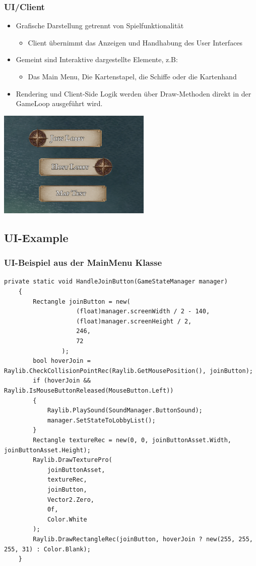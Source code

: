 \documentclass{beamer}
\begin{document}
\begin{frame}
  \frametitle{UI/Client}
  \begin{itemize}
    \item Grafische Darstellung getrennt von Spielfunktionalität
      \begin{itemize}
        \item Client übernimmt das Anzeigen und Handhabung des User Interfaces 
      \end{itemize}
    \item Gemeint sind Interaktive dargestellte Elemente, z.B:
    \begin{itemize} 
      \item Das Main Menu, Die Kartenstapel, die Schiffe oder die Kartenhand
    \end{itemize}
    \item Rendering und Client-Side Logik werden über Draw-Methoden direkt in der GameLoop ausgeführt wird.
  \end{itemize} 
  \centering
  \includegraphics[width=0.55\textwidth]{MainMenu.png}
\end{frame}

\subsection{UI-Example}
\begin{frame}[fragile]
  \frametitle{UI-Beispiel aus der MainMenu Klasse}
  \begin{lstlisting}[language=CSharp, basicstyle=\ttfamily\tiny, breaklines=true]
    private static void HandleJoinButton(GameStateManager manager)
    {
        Rectangle joinButton = new(
                    (float)manager.screenWidth / 2 - 140,
                    (float)manager.screenHeight / 2,
                    246,
                    72
                );
        bool hoverJoin = Raylib.CheckCollisionPointRec(Raylib.GetMousePosition(), joinButton);
        if (hoverJoin && Raylib.IsMouseButtonReleased(MouseButton.Left))
        {
            Raylib.PlaySound(SoundManager.ButtonSound);
            manager.SetStateToLobbyList();
        }
        Rectangle textureRec = new(0, 0, joinButtonAsset.Width, joinButtonAsset.Height);
        Raylib.DrawTexturePro(
            joinButtonAsset,
            textureRec,
            joinButton,
            Vector2.Zero,
            0f,
            Color.White
        );
        Raylib.DrawRectangleRec(joinButton, hoverJoin ? new(255, 255, 255, 31) : Color.Blank);
    }
  \end{lstlisting}
\end{frame}
\end{document}
